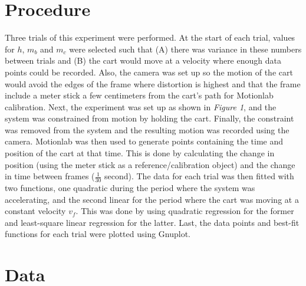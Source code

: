 \documentclass[12pt,letterpaper]{article}
\begin{document}
\section{Procedure}
Three trials of this experiment were performed. At the start of each trial, values for \(h\), \(m_b\) and \(m_c\) were selected such that (A) there was variance in these numbers between trials and (B) the cart would move at a velocity where enough data points could be recorded. Also, the camera was set up so the motion of the cart would avoid the edges of the frame where distortion is highest and that the frame include a meter stick a few centimeters from the cart's path for Motionlab calibration. Next, the experiment was set up as shown in \textit{Figure 1}, and the system was constrained from motion by holding the cart. Finally, the constraint was removed from the system  and the resulting motion was recorded using the camera. Motionlab was then used to generate points containing the time and position of the cart at that time. This is done by calculating the change in position (using the meter stick as a reference/calibration object) and the change in time between frames (\(\frac{1}{30}\) second). The data for each trial was then fitted with two functions, one quadratic during the period where the system was accelerating, and the second linear for the period where the cart was moving at a constant velocity \(v_f\). This was done by using quadratic regression for the former and least-square linear regression for the latter. Last, the data points and best-fit functions for each trial were plotted using Gnuplot.
\section{Data}
\end{document}
